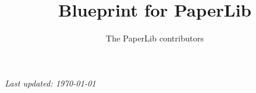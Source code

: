 \documentclass{report}
\title{Blueprint for PaperLib}
\author{The PaperLib contributors}
\begin{document}
\maketitle
\noindent\textit{Last updated: \today}\par\smallskip



\end{document}

